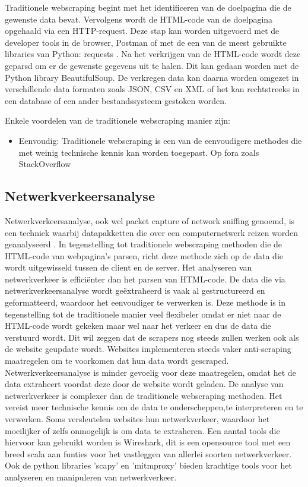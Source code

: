 Traditionele webscraping begint met het identificeren van de doelpagina die de gewenste data bevat. Vervolgens wordt de HTML-code van de doelpagina opgehaald via een HTTP-request. Deze stap kan worden uitgevoerd met de developer tools  in de browser, Postman of met de een van de meest gebruikte libraries van Python: requests \autocite{Nate2023}.  Na het verkrijgen van de HTML-code wordt deze geparsd om er de gewenste gegevens uit te halen. Dit kan gedaan worden met de Python library BeautifulSoup. De verkregen data kan daarna worden omgezet in verschillende data formaten zoals JSON, CSV en XML of het kan rechtstreeks  in een database of een ander bestandssysteem gestoken worden.

Enkele voordelen van de traditionele webscraping manier zijn:
\begin{itemize}
    \item Eenvoudig: Traditionele webscraping is een van de eenvoudigere methodes die met weinig technische kennis kan worden toegepast. Op fora zoals StackOverflow
\end{itemize}


\subsection{Netwerkverkeersanalyse}

Netwerkverkeersanalyse, ook wel packet capture of network sniffing genoemd, is een techniek waarbij datapakketten die over een computernetwerk reizen worden geanalyseerd \autocite{Chapple2018}.  In tegenstelling tot traditionele webscraping methoden die de HTML-code van webpagina’s parsen, richt deze methode zich op de data die wordt uitgewisseld tussen de client en de server. Het analyseren van netwerkverkeer is efficiënter dan het parsen van HTML-code.  De
data die via netwerkverkeersanalyse wordt geëxtraheerd is vaak al gestructureerd en geformatteerd, waardoor het eenvoudiger te verwerken is.
Deze methode is in tegenstelling tot de traditionele manier veel flexibeler omdat er niet naar de
HTML-code wordt gekeken maar wel naar het verkeer en dus de data die verstuurd wordt. Dit wil
zeggen dat de scrapers nog steeds zullen werken
ook als de website geupdate wordt. Websites implementeren steeds vaker anti-scraping maatregelen om te voorkomen dat hun data wordt gescraped. Netwerkverkeersanalyse is minder gevoelig voor deze maatregelen, omdat het de data
extraheert voordat deze door de website wordt
geladen. De analyse van netwerkverkeer is
complexer dan de traditionele webscraping methoden. Het vereist meer technische kennis om
de data te onderscheppen,te interpreteren en te
verwerken. Soms versleutelen websites hun netwerkverkeer, waardoor het moeilijker of zelfs onmogelijk is om data te extraheren. Een aantal tools die hiervoor kan gebruikt worden is Wireshark,
dit is een opensource tool met een breed scala
aan funties voor het vastleggen van allerlei soorten netwerkverkeer. Ook de python libraries ’scapy’
en ’mitmproxy’ bieden krachtige tools voor het
analyseren en manipuleren van netwerkverkeer.

